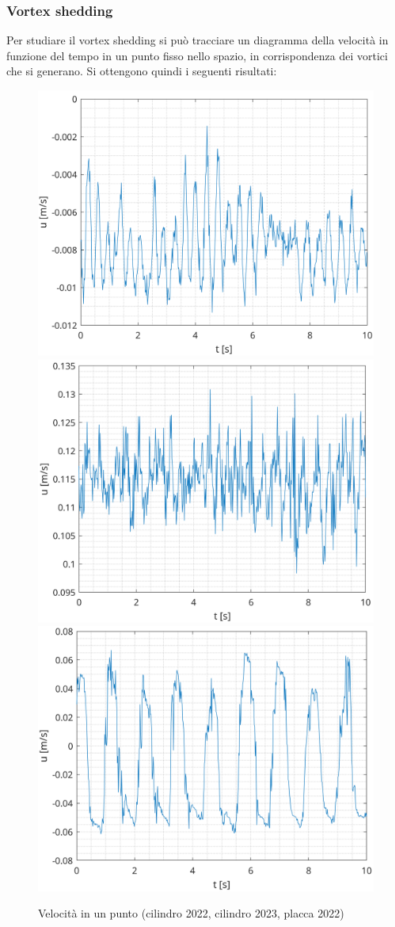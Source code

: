 \subsubsection{Vortex shedding}
Per studiare il vortex shedding si può tracciare un diagramma della velocità in funzione del tempo in un punto fisso nello spazio, in corrispondenza dei vortici che si generano. Si ottengono quindi i seguenti risultati:
\begin{figure}[H]
    \centering
    \includegraphics[width=.55\textwidth]{images/11/timeseries22.png}
    \includegraphics[width=.49\textwidth]{images/11/timeseries23.png}
    \includegraphics[width=.49\textwidth]{images/11/timeseries220.png}
    \caption{Velocità in un punto (cilindro 2022, cilindro 2023, placca 2022)}
\end{figure}

